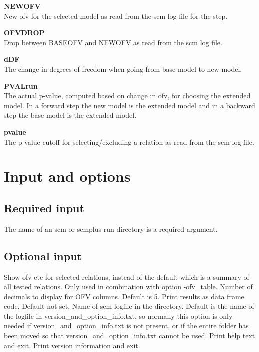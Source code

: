 \documentclass[hideglossary,notoc,hidelof,hidelot,hideTheSignaturePage,hideLinkCurrent,hideloa,pdfLatex,noClient,notitle,hideConfidential]{PMXstyle-20190820}
\begin{document}
{\bfseries NEWOFV}\\
New ofv for the selected model as read from the scm log file for the step.

{\bfseries OFVDROP}\\
Drop between BASEOFV and NEWOFV as read from the scm log file.

{\bfseries dDF}\\
The change in degrees of freedom when going from base model to new model.

{\bfseries PVALrun}\\
The actual p-value, computed based on change in ofv, for choosing the extended model.
In a forward step the new model is the extended model and in a backward step the base model is the extended model.

{\bfseries pvalue}\\
The p-value cutoff for selecting/excluding a relation as read from the scm log file.

\newpage

\section{Input and options}

\subsection{Required input}
The name of an scm or scmplus run directory is a required argument.

\subsection{Optional input}

\begin{optionlist}
Show ofv etc for selected relations, instead of the default which is
a summary of all tested relations.
\nextopt
{}
Only used in combination with option -ofv\_table.
Number of decimals to display for OFV columns. Default is 5.
\nextopt
{}
Print results as data frame code. Default not set.
\nextopt
{}
Name of scm logfile in the directory. 
Default is the name of the logfile in
version\_and\_option\_info.txt, 
so normally this option is only needed if version\_and\_option\_info.txt is not present,
or if the entire folder has been moved so that version\_and\_option\_info.txt cannot be used.
\nextopt
{}
Print help text and exit.
\nextopt
{}
Print version information and exit.
\nextopt
\end{optionlist}
\end{document}
